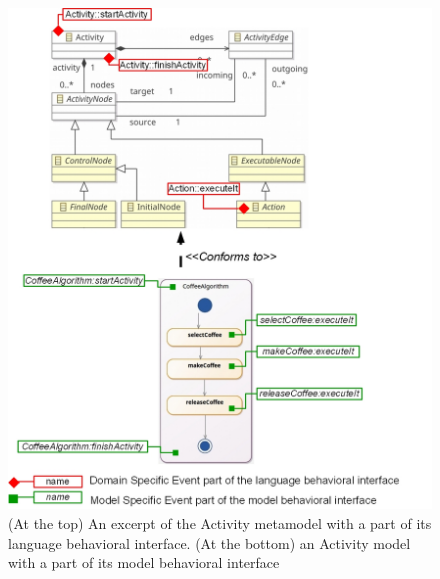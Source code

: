 	\begin{figure}
		\begin{center}
			\includegraphics[width=1\textwidth]{bcool/figs/admm.jpg}
			\caption{(At the top) An excerpt of the Activity metamodel with a part of its language behavioral interface. (At the bottom) an Activity model with a part of its model behavioral interface}
			\label{fig:activitymm}
		\end{center}
	\end{figure}
	

